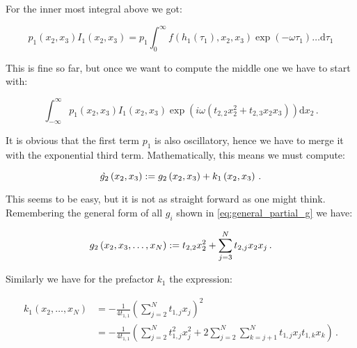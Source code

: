 \documentclass[a4paper,10pt]{article}
\begin{document}
For the inner most integral above we got:

\begin{equation}
  p_1\left(x_2, x_3\right)
  I_1\left(x_2, x_3\right) = p_1
                             \int_0^{\infty} f\left(h_1(\tau_1), x_2, x_3\right)
                                             \exp\left(- \omega \tau_1 \right)
                                             \ldots
                             \mathrm{d}\tau_1
\end{equation}

This is fine so far, but once we want to compute the middle one
we have to start with:

\begin{equation}
  \int_{-\infty}^{\infty} p_1\left(x_2, x_3\right) I_1\left(x_2, x_3\right)
                          \exp\left(i \omega \left(t_{2,2} x_2^2 + t_{2,3} x_2 x_3\right) \right)
  \mathrm{d}x_2 \,.
\end{equation}

It is obvious that the first term $p_1$ is also oscillatory,
hence we have to merge it with the exponential third term.
Mathematically, this means we must compute:

\begin{equation}
  \grave{g_2}\left(x_2, x_3\right) := g_2\left(x_2, x_3\right) + k_1\left(x_2, x_3\right) \,.
\end{equation}

This seems to be easy, but it is not as straight forward as
one might think. Remembering the general form of all $g_i$
shown in \eqref{eq:general_partial_g} we have:

\begin{equation}
  g_2\left(x_2, x_3, \ldots, x_N\right)
  := t_{2,2} x_2^2 + \sum_{j=3}^{N} t_{2,j} x_2 x_j \,.
\end{equation}

Similarly we have for the prefactor $k_1$ the expression:

\begin{equation}
\begin{split}
  k_1(x_2, \ldots, x_N)
  & = - \frac{1}{4 t_{1,1}} \left( \sum_{j=2}^{N} t_{1,j} x_j \right)^2 \\
  & = - \frac{1}{4 t_{1,1}} \left( \sum_{j=2}^{N} t_{1,j}^2 x_j^2
                               + 2 \sum_{j=2}^{N} \sum_{k=j+1}^{N} t_{1,j} x_j t_{1,k} x_k
                            \right) \,.
\end{split}
\end{equation}
\end{document}
